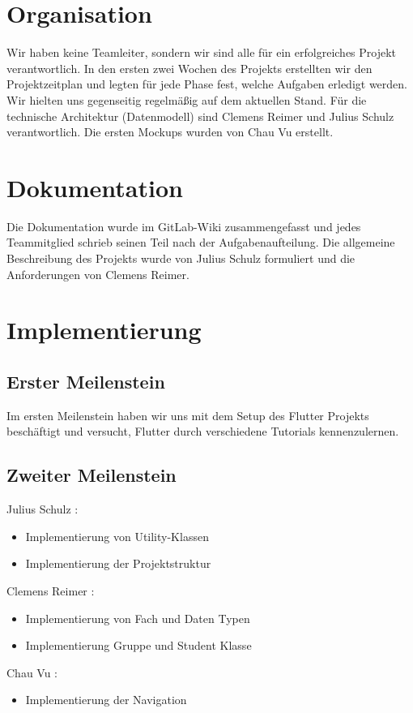 \documentclass[
  a4paper,
  DIV=10,
  oneside,
  BCOR=5mm,
  parskip=half,
  numbers=noenddot
]{scrreprt}
\begin{document}
\section{Organisation}
Wir haben keine Teamleiter, sondern wir sind alle für ein erfolgreiches Projekt verantwortlich.
In den ersten zwei Wochen des Projekts erstellten wir den Projektzeitplan und legten für jede Phase fest, welche Aufgaben erledigt werden. Wir hielten uns gegenseitig regelmäßig auf dem aktuellen Stand. 
Für die technische Architektur (Datenmodell) sind Clemens Reimer und Julius Schulz verantwortlich. 
Die ersten Mockups wurden von Chau Vu erstellt.
\section{Dokumentation}
Die Dokumentation wurde im GitLab-Wiki zusammengefasst und jedes Teammitglied schrieb seinen Teil nach der Aufgabenaufteilung. Die allgemeine Beschreibung des Projekts wurde von Julius Schulz formuliert und die Anforderungen von Clemens Reimer.
\section{Implementierung}
\subsection{Erster Meilenstein}
Im ersten Meilenstein haben wir uns mit dem Setup des Flutter Projekts beschäftigt und versucht, Flutter durch verschiedene Tutorials kennenzulernen.
\subsection{Zweiter Meilenstein}
Julius Schulz :
\begin{itemize}
  \item Implementierung von Utility-Klassen
  \item Implementierung der Projektstruktur
\end{itemize}
Clemens Reimer : 
\begin{itemize}
  \item Implementierung von Fach und Daten Typen
  \item Implementierung Gruppe und Student Klasse
\end{itemize}
Chau Vu :
\begin{itemize}
  \item Implementierung der Navigation
\end{itemize}
\end{document}
